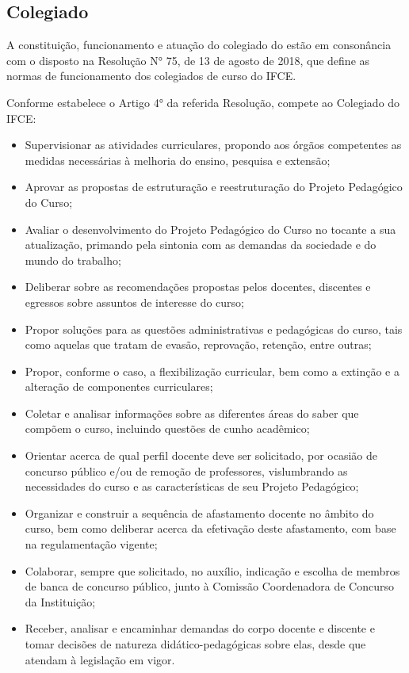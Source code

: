 \subsection{Colegiado}


A constituição, funcionamento e atuação do colegiado do \NOMECURSO estão em consonância com o disposto na Resolução N° 75, de 13 de agosto de 2018, que define as normas de funcionamento dos colegiados de curso do IFCE.

Conforme estabelece o Artigo 4° da referida Resolução, compete ao Colegiado do IFCE:

\begin{itemize}
	\item Supervisionar as atividades curriculares, propondo aos órgãos competentes as medidas necessárias à melhoria do ensino, pesquisa e extensão;
	\item Aprovar as propostas de estruturação e reestruturação do Projeto Pedagógico do Curso;
	\item Avaliar o desenvolvimento do Projeto Pedagógico do Curso no tocante a sua atualização, primando pela sintonia com as demandas da sociedade e do mundo do trabalho;
	\item Deliberar sobre as recomendações propostas pelos docentes, discentes e egressos sobre assuntos de interesse do curso;
	\item Propor soluções para as questões administrativas e pedagógicas do curso, tais como aquelas que tratam de evasão, reprovação, retenção, entre outras;
	\item Propor, conforme o caso, a flexibilização curricular, bem como a extinção e a alteração de componentes curriculares;
	\item Coletar e analisar informações sobre as diferentes áreas do saber que compõem o curso, incluindo questões de cunho acadêmico;
	\item Orientar acerca de qual perfil docente deve ser solicitado, por ocasião de concurso público e/ou de remoção de professores, vislumbrando as necessidades do curso e as características de seu Projeto Pedagógico;
	\item Organizar e construir a sequência de afastamento docente no âmbito do curso, bem como deliberar acerca da efetivação deste afastamento, com base na regulamentação vigente;
	\item Colaborar, sempre que solicitado, no auxílio, indicação e escolha de membros de banca de concurso público, junto à Comissão Coordenadora de Concurso da Instituição;
	\item Receber, analisar e encaminhar demandas do corpo docente e discente e tomar decisões de natureza didático-pedagógicas sobre elas, desde que atendam à legislação em vigor.
\end{itemize}


